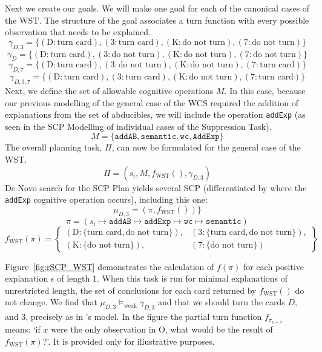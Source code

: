 Next we create our goals. We will make one goal for each of the canonical cases of the WST. The structure of the goal associates a turn function with every possible observation that needs to be explained.
\[\gamma_{D,3}=\{(\text{D}:\text{turn card}),(\text{3}:\text{turn card}),(\text{K}:\text{do not turn}),(\text{7}:\text{do not turn})\}\]
\[\gamma_{D}=\{(\text{D}:\text{turn card}),(\text{3}:\text{do not turn}),(\text{K}:\text{do not turn}),(\text{7}:\text{do not turn})\}\]
\[\gamma_{D,7}=\{(\text{D}:\text{turn card}),(\text{3}:\text{do not turn}),(\text{K}:\text{do not turn}),(\text{7}:\text{turn card})\}\]
\[\gamma_{D,3,7}=\{(\text{D}:\text{turn card}),(\text{3}:\text{turn card}),(\text{K}:\text{do not turn}),(\text{7}:\text{turn card})\}\]
Next, we define the set of allowable cognitive operations $M$. In this case, because our previous modelling of the general case of the WCS required the addition of explanations from the set of abducibles, we will include the operation \texttt{addExp} (as seen in the SCP Modelling of individual cases of the Suppression Task).
\[M=\{\texttt{addAB}, \texttt{semantic}, \texttt{wc}, \texttt{AddExp}\}\]
The overall planning task, $\Pi$, can now be formulated for the general case of the WST.
\[\Pi=(s_i,M,f_\text{WST}(),\gamma_{D,3})\]
De Novo search for the SCP Plan yields several SCP (differentiated by where the \texttt{addExp} cognitive operation occurs), including this one:
\[\mu_{D,3}=(\pi,f_\text{WST}())\}\]
\[
\pi=(s_i\longmapsto \texttt{addAB} \longmapsto \texttt{addExp} \longmapsto \texttt{wc} \longmapsto \texttt{semantic})
\]
\[
f_\text{WST}(\pi)=
\left\lbrace
\begin{matrix}
(\text{D}:\{\text{turn card},\text{do not turn}\}), & 
(\text{3}:\{\text{turn card},\text{do not turn}\}), \\
(\text{K}:\{\text{do not turn}\}), &
(\text{7}:\{\text{do not turn}\})
\end{matrix}
\right\rbrace
\]



Figure~\ref{fig:rSCP_WST} demonstrates the calculation of $f(\pi)$ for each positive explanation $\epsilon$ of length 1. When this task is run for minimal explanations of unrestricted length, the set of conclusions for each card returned by $f_\text{WST}()$ do not change. We find that $\mu_{D,3}\models_\text{weak} \gamma_{D,3}$ and that we should turn the cards $D$, and $3$, precisely as in \cite{dietz2014modeling}'s model. In the figure the partial turn function $f_{\pi_{o=x}}$ means: `if $x$ were the only observation in O, what would be the result of $f_\text{WST}(\pi)$?'. It is provided only for illustrative purposes.

